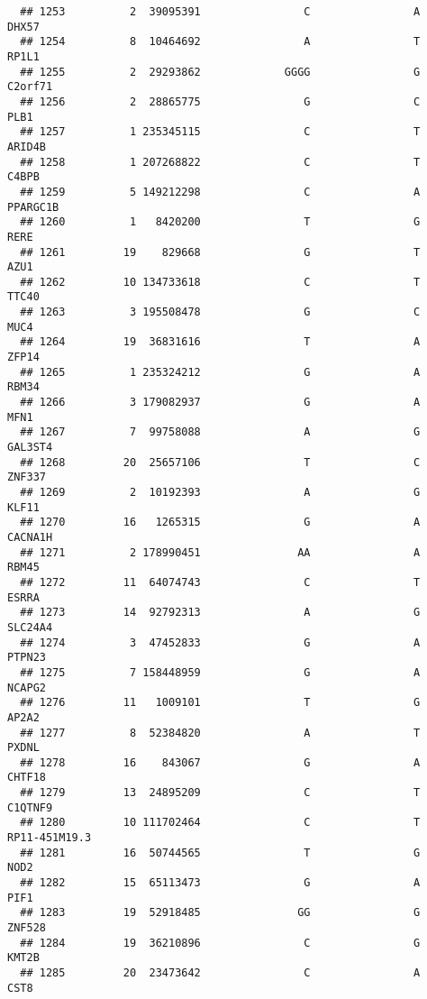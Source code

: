 \documentclass[12pt,twoside]{reedthesis}
\theoremstyle{definition}
\theoremstyle{definition}
\theoremstyle{remark}
\begin{document}
\begin{verbatim}
  ## 1253          2  39095391                C                A          DHX57
  ## 1254          8  10464692                A                T          RP1L1
  ## 1255          2  29293862             GGGG                G        C2orf71
  ## 1256          2  28865775                G                C           PLB1
  ## 1257          1 235345115                C                T         ARID4B
  ## 1258          1 207268822                C                T          C4BPB
  ## 1259          5 149212298                C                A       PPARGC1B
  ## 1260          1   8420200                T                G           RERE
  ## 1261         19    829668                G                T           AZU1
  ## 1262         10 134733618                C                T          TTC40
  ## 1263          3 195508478                G                C           MUC4
  ## 1264         19  36831616                T                A          ZFP14
  ## 1265          1 235324212                G                A          RBM34
  ## 1266          3 179082937                G                A           MFN1
  ## 1267          7  99758088                A                G        GAL3ST4
  ## 1268         20  25657106                T                C         ZNF337
  ## 1269          2  10192393                A                G          KLF11
  ## 1270         16   1265315                G                A        CACNA1H
  ## 1271          2 178990451               AA                A          RBM45
  ## 1272         11  64074743                C                T          ESRRA
  ## 1273         14  92792313                A                G        SLC24A4
  ## 1274          3  47452833                G                A         PTPN23
  ## 1275          7 158448959                G                A         NCAPG2
  ## 1276         11   1009101                T                G          AP2A2
  ## 1277          8  52384820                A                T          PXDNL
  ## 1278         16    843067                G                A         CHTF18
  ## 1279         13  24895209                C                T        C1QTNF9
  ## 1280         10 111702464                C                T  RP11-451M19.3
  ## 1281         16  50744565                T                G           NOD2
  ## 1282         15  65113473                G                A           PIF1
  ## 1283         19  52918485               GG                G         ZNF528
  ## 1284         19  36210896                C                G          KMT2B
  ## 1285         20  23473642                C                A           CST8

\end{verbatim}
\end{document}
